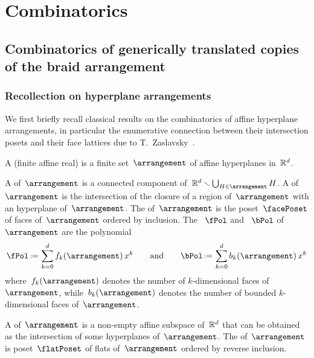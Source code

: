 
\section{Combinatorics}

\subsection{Combinatorics of generically translated copies of the braid arrangement}
\label{sec:kBraidArrangement}

\subsubsection{Recollection on hyperplane arrangements}
\label{subsec:arrangements}

We first briefly recall classical results on the combinatorics of affine hyperplane arrangements, in particular the enumerative connection between their intersection posets and their face lattices due to T.~Zaslavsky~\cite{Zaslavsky}.

\begin{definition}
A (finite affine real)  is a finite set~$\arrangement$ of affine hyperplanes in~$\mathbb R^d$.
\end{definition}

\begin{definition}
A  of~$\arrangement$ is a connected component of~$\R^d \ssm \bigcup_{H \in \arrangement} H$.
A  of~$\arrangement$ is the intersection of the closure of a region of~$\arrangement$ with an hyperplane of~$\arrangement$.
The  of~$\arrangement$ is the poset~$\facePoset$ of faces of~$\arrangement$ ordered by inclusion.
The ~$\fPol$ and ~$\bPol$ of~$\arrangement$ are the polynomial
\[
\fPol \eqdef \sum_{k = 0}^d f_k(\arrangement) \, x^k
\qquad\text{and}\qquad
\bPol \eqdef \sum_{k = 0}^d b_k(\arrangement) \, x^k
\]
where~$f_k(\arrangement)$ denotes the number of $k$-dimensional faces of~$\arrangement$, while~$b_k(\arrangement)$ denotes the number of bounded $k$-dimensional faces of~$\arrangement$.
\end{definition}

\begin{definition}
A  of~$\arrangement$ is a non-empty affine subspace of~$\mathbb R^d$ that can be obtained as the intersection of some hyperplanes of~$\arrangement$.
The  of~$\arrangement$ is poset~$\flatPoset$ of flats of~$\arrangement$ ordered by reverse inclusion.
\end{definition}

